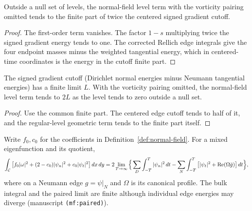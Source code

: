 \begin{lemma}
\label{lem:mixed-geometric-level}
\leanok
Outside a null set of levels, the normal-field level term with the
vorticity pairing omitted tends to the finite part of twice the centered
signed gradient cutoff.
\end{lemma}

\begin{proof}
\leanok
The first-order term vanishes. The factor $1-s$ multiplying twice the
signed gradient energy tends to one. The corrected Rellich edge
integrals give the four endpoint masses minus the weighted tangential
energy, which in centered-time coordinates is the energy in the
cutoff finite part.
\end{proof}

\begin{lemma}
\label{lem:mixed-geometric-flux}
\leanok
The signed gradient cutoff (Dirichlet normal energies minus Neumann
tangential energies) has a finite limit $L$. With the vorticity pairing
omitted, the normal-field level term tends to $2L$ as the level tends to
zero outside a null set.
\end{lemma}

\begin{proof}
\leanok
Use the common finite part. The centered edge cutoff tends to half
of it, and the regular-level geometric term tends to the finite part
itself.
\end{proof}

\begin{proposition}
\label{prop:mixed-paired-flux}
\leanok
Write $f_0,c_0$ for the coefficients in Definition~\ref{def:normal-field}.
For a mixed eigenfunction and its quotient,
\[
  \int_{\mathcal{C}}\big[f_0|\omega|^2+(2-c_0)|\psi_n|^2+c_0|\psi_t|^2\big]\,dx\,dy
  =2\lim_{T\to\infty}\Big\{\sum_D\int_{-T}^T|\psi_n|^2\,dt
  -\sum_N\int_{-T}^T\big[|\psi_t|^2+\operatorname{Re}(\Omega\bar g)\big]\,dt\Big\},
\]
where on a Neumann edge $g=\psi|_N$ and $\Omega$ is its canonical profile. The
bulk integral and the paired limit are finite although individual edge
energies may diverge (manuscript \texttt{(mf:paired)}).
\end{proposition}

